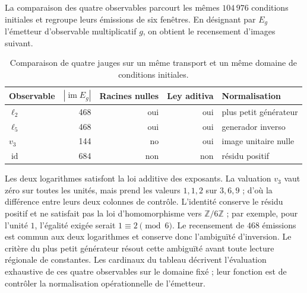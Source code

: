 La comparaison des quatre observables parcourt les mêmes \(104\,976\) conditions initiales et regroupe leurs émissions de six fenêtres. En désignant par \(E_g\) l'émetteur d'observable multiplicatif \(g\), on obtient le recensement d'images suivant.
\begin{table}[htbp]
\centering
\small
\begin{tabular}{@{}lrrrl@{}}
\toprule
Observable & \(|\operatorname{im}E_g|\) & Racines nulles
 & Ley aditiva & Normalisation\\
\midrule
\(\ell_2\)&468&oui&oui&plus petit générateur\\
\(\ell_5\)&468&oui&oui&generador inverso\\
\(v_3\)&144&no&oui&image unitaire nulle\\
\(\operatorname{id}\)&684&non&non&résidu positif\\
\bottomrule
\end{tabular}
\caption{Comparaison de quatre jauges sur un même transport et un même domaine de conditions initiales.}
\label{mg05:tabla-calibres}
\end{table}

Les deux logarithmes satisfont la loi additive des exposants. La valuation
\(v_3\) vaut zéro sur toutes les unités, mais prend les valeurs
\(1,1,2\) sur \(3,6,9\) ; d'où la différence entre leurs deux colonnes
de contrôle. L'identité conserve le résidu positif et ne satisfait pas la loi
d'homomorphisme vers \(\mathbb Z/6\mathbb Z\) ; par exemple, pour
l'unité \(1\), l'égalité exigée serait \(1\equiv2\pmod6\).
Le recensement de \(468\) émissions est commun aux deux logarithmes et
conserve donc l'ambiguïté d'inversion. Le critère du plus petit
générateur résout cette ambiguïté avant toute lecture régionale
de constantes. Les cardinaux du tableau décrivent l'évaluation
exhaustive de ces quatre observables sur le domaine fixé ; leur
fonction est de contrôler la normalisation opérationnelle de l'émetteur.

